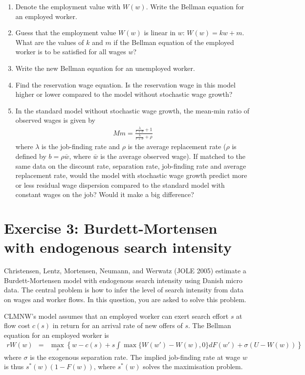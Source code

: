 \documentclass[11pt]{article}
\newcommand{\ben}{\begin{enumerate}}
\newcommand{\een}{\end{enumerate}}
\begin{document}
\ben
\item Denote the employment value with $W(w)$. Write the Bellman equation for an employed worker.

\item Guess that the employment value $W(w)$ is linear in $w$: $W(w)=kw+m$. What are the values of $k$ and $m$ if the Bellman equation of the employed worker is to be satisfied for all wages $w$? 

\item Write the new Bellman equation for an unemployed worker.

\item Find the reservation wage equation. Is the reservation wage in this model higher or lower compared to the model without stochastic wage growth?

\item In the standard model without stochastic wage growth, the mean-min ratio of observed wages is given by
\begin{eqnarray}
Mm = \frac{\frac{\lambda}{r+\sigma}+1}{\frac{\lambda}{r+\sigma}+\rho} \nonumber
\end{eqnarray}
where $\lambda$ is the job-finding rate and $\rho$ is the average replacement rate ($\rho$ is defined by $b=\rho \bar w$, where $\bar w$ is the average observed wage). If matched to the same data on the discount rate, separation rate, job-finding rate and average replacement rate, would the model with stochastic wage growth predict more or less residual wage dispersion compared to the standard model with constant wages on the job? Would it make a big difference?
\een


\section*{Exercise 3: Burdett-Mortensen with endogenous search intensity}
Christensen, Lentz, Mortensen, Neumann, and Werwatz (JOLE 2005) estimate a Burdett-Mortensen model with endogenous search intensity using Danish micro data. The central problem is how to infer the level of search intensity from data on wages and worker flows. In this question, you are asked to solve this problem.

CLMNW's model assumes that an employed worker can exert search effort $s$ at flow cost $c(s)$ in return for an arrival rate of new offers of $s$. The Bellman equation for an employed worker is
\begin{eqnarray}
rW(w)  &=& \max_{s} \left\{ w - c(s) + s  \int \max\{W(w')-W(w), 0\} dF(w')  + \sigma(U-W(w))\right\} \nonumber
\end{eqnarray}
where $\sigma$ is the exogenous separation rate. The implied job-finding rate at wage $w$ is thus $s^*(w)(1-F(w))$, where $s^*(w)$ solves the maximisation problem.
\end{document}
